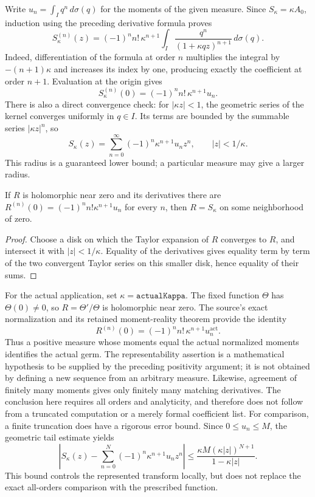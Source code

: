 \label{res:germ}
Write $u_n=\int_Iq^n\,d\sigma(q)$ for the moments of the given measure.
Since $S_\kappa=\kappa A_0$, induction using the preceding derivative
formula proves
\[
 S_\kappa^{(n)}(z)
 =(-1)^n n!\,\kappa^{n+1}
   \int_I\frac{q^n}{(1+\kappa qz)^{n+1}}\,d\sigma(q).
\]
Indeed, differentiation of the formula at order $n$ multiplies the
integral by $-(n+1)\kappa$ and increases its index by one, producing
exactly the coefficient at order $n+1$. Evaluation at the origin gives
\[
 S_\kappa^{(n)}(0)=(-1)^n n!\,\kappa^{n+1}u_n.
\]
There is also a direct convergence check: for $|\kappa z|<1$, the
geometric series of the kernel converges uniformly in $q\in I$.
Its terms are bounded by the summable series $|\kappa z|^n$, so
\[
 S_\kappa(z)=\sum_{n=0}^{\infty}(-1)^n\kappa^{n+1}u_nz^n,
 \qquad |z|<1/\kappa.
\]
This radius is a guaranteed lower bound; a particular measure may give
a larger radius.

\begin{proposition}
If $R$ is holomorphic near zero and its derivatives there are
$R^{(n)}(0)=(-1)^n n!\kappa^{n+1}u_n$ for every $n$, then $R=S_\kappa$
on some neighborhood of zero.
\end{proposition}
\begin{proof}
Choose a disk on which the Taylor expansion of $R$ converges to $R$,
and intersect it with $|z|<1/\kappa$. Equality of the derivatives gives
equality term by term of the two convergent Taylor series on this
smaller disk, hence equality of their sums.
\end{proof}

For the actual application, set $\kappa=\texttt{actualKappa}$.
The fixed function $\Theta$ has
$\Theta(0)\ne0$, so $R=\Theta'/\Theta$ is holomorphic near zero. The
source's exact normalization and its retained moment-reality theorem
provide the identity
\[
 R^{(n)}(0)=(-1)^n n!\,\kappa^{n+1}u_n^{\mathrm{act}}.
\]
Thus a positive measure whose moments equal the actual normalized
moments identifies the actual germ. The representability assertion is
a mathematical hypothesis to be supplied by the preceding positivity
argument; it is not obtained by defining a new sequence from an
arbitrary measure. Likewise, agreement of finitely many moments gives
only finitely many matching derivatives. The conclusion here requires
all orders and analyticity, and therefore does not follow from a
truncated computation or a merely formal coefficient list.
For comparison, a finite truncation does have a rigorous error bound.
Since $0\le u_n\le M$, the geometric tail estimate yields
\[
 \left|S_\kappa(z)-\sum_{n=0}^N(-1)^n\kappa^{n+1}u_nz^n\right|
 \le\frac{\kappa M(\kappa|z|)^{N+1}}{1-\kappa|z|}.
\]
This bound controls the represented transform locally, but does not
replace the exact all-orders comparison with the prescribed function.


